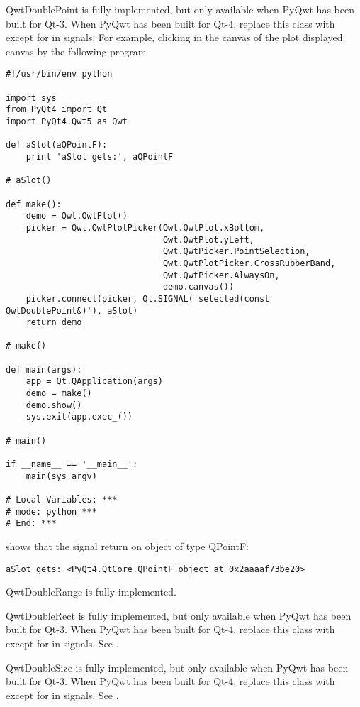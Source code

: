 \documentclass{manual}
\begin{document}
\begin{classdesc*}{QwtDoublePoint}
  is fully implemented, but only available when PyQwt has been built for Qt-3.
  When PyQwt has been built for Qt-4, replace this class with 
  except for in signals.
  For example, clicking in the canvas of the plot displayed canvas by the
  following program
  \begin{verbatim}
#!/usr/bin/env python

import sys
from PyQt4 import Qt
import PyQt4.Qwt5 as Qwt

def aSlot(aQPointF):
    print 'aSlot gets:', aQPointF

# aSlot()

def make():
    demo = Qwt.QwtPlot()
    picker = Qwt.QwtPlotPicker(Qwt.QwtPlot.xBottom,
                               Qwt.QwtPlot.yLeft,
                               Qwt.QwtPicker.PointSelection,
                               Qwt.QwtPlotPicker.CrossRubberBand,
                               Qwt.QwtPicker.AlwaysOn,
                               demo.canvas())
    picker.connect(picker, Qt.SIGNAL('selected(const QwtDoublePoint&)'), aSlot)
    return demo

# make()

def main(args):
    app = Qt.QApplication(args)
    demo = make()
    demo.show()
    sys.exit(app.exec_())

# main()

if __name__ == '__main__':
    main(sys.argv)

# Local Variables: ***
# mode: python ***
# End: ***
  \end{verbatim}
  shows that the signal return on object of type QPointF:
  \begin{verbatim}
aSlot gets: <PyQt4.QtCore.QPointF object at 0x2aaaaf73be20>
  \end{verbatim}
\end{classdesc*}

\begin{classdesc*}{QwtDoubleRange}
  is fully implemented.
\end{classdesc*}

\begin{classdesc*}{QwtDoubleRect}
  is fully implemented, but only available when PyQwt has been built for Qt-3.
  When PyQwt has been built for Qt-4, replace this class with 
  except for in signals. See .
\end{classdesc*}

\begin{classdesc*}{QwtDoubleSize}
  is fully implemented, but only available when PyQwt has been built for Qt-3.
  When PyQwt has been built for Qt-4, replace this class with 
  except for in signals. See .
\end{classdesc*}
\end{document}
